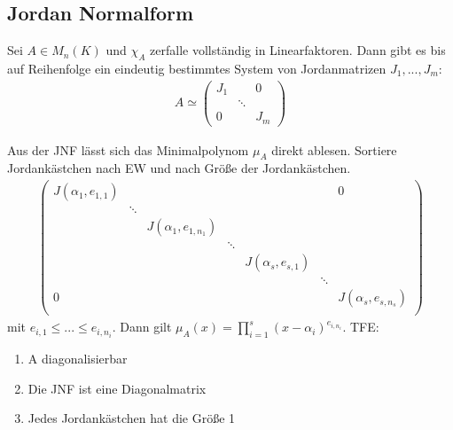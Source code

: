 \subsection{Jordan Normalform}
\begin{theorem}
Sei $A \in M_n(K)$ und $\chi_A$ zerfalle vollständig in Linearfaktoren. Dann gibt es bis auf Reihenfolge ein eindeutig bestimmtes System von Jordanmatrizen $J_1,...,J_m$:
\begin{align*}
A \simeq 
\begin{pmatrix}
J_1 & & 0\\
    & \ddots & \\
0   &        & J_m
\end{pmatrix}
\end{align*}
\end{theorem}
\begin{remark}
Aus der JNF lässt sich das Minimalpolynom $\mu_A$ direkt ablesen. Sortiere Jordankästchen nach EW und nach Größe der Jordankästchen.
\begin{align*}
\begin{pmatrix}
J(\alpha_1,e_{1,1}) & & & & & & 0\\
& \ddots & & & & & \\
 & & J(\alpha_1,e_{1,n_1}) & & & & \\
 & & & \ddots & & & \\
 & & & & J(\alpha_s,e_{s,1}) & &\\
 & & & & & \ddots & \\
0 & & & & & & J(\alpha_s,e_{s,n_s}) \\
\end{pmatrix}
\end{align*}
mit $e_{i,1} \leq ... \leq e_{i,n_i}$. Dann gilt $\mu_A(x)=\prod \limits_{i=1}^s (x-\alpha_i)^{e_{i,n_i}}$. TFE:
\begin{enumerate}
	\item A diagonalisierbar
	\item Die JNF ist eine Diagonalmatrix
	\item Jedes Jordankästchen hat die Größe 1
\end{enumerate}
\end{remark}
